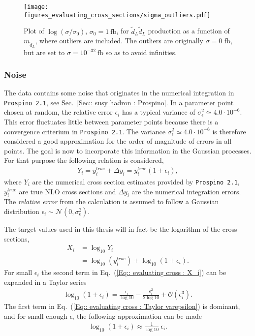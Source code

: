 \documentclass[twoside,english]{uiofysmaster}
\begin{document}
{{\begin{figure}
\centering
\texttt{[image: figures\_evaluating\_cross\_sections/sigma\_outliers.pdf]}
\caption[Plot of cross sections with outlier points]{Plot of $\log( \sigma / \sigma_0)$, $\sigma_0 = 1~\mathrm{fb}$, for $\widetilde{d}_L \widetilde{d}_L$ production as a function of $m_{\widetilde{d}_L}$, where outliers are included. The outliers are originally $\sigma=0$ fb, but are set to $\sigma =10^{-32}~\mathrm{fb}$ so as to avoid infinities.}
\label{Fig:: evaluating cross : sigma w outliers}
\end{figure}


\subsubsection{Noise}\label{Sec:: evaluating cross : Noise in dataset}

The data contains some noise that originates in the numerical integration in \verb|Prospino 2.1|, see Sec.~\ref{Sec:: susy hadron : Prospino}. In a parameter point chosen at random, the relative error $\epsilon_i$ has a typical variance of $\sigma^2_{\epsilon} \simeq 4.0 \cdot 10^{-6}$. This error fluctuates little between parameter points because there is a convergence criterium in \verb|Prospino 2.1|. The variance $\sigma^2_{\epsilon} \simeq 4.0 \cdot 10^{-6}$ is therefore considered a good approximation for the order of magnitude of errors in all points. The goal is now to incorporate this information in the Gaussian processes. For that purpose the following relation is considered,
\begin{align}\label{Eq:: cross section w/ error}
Y_i = y^{true}_i + \Delta y_i = y_i^{true}(1 + \epsilon_i),
\end{align}
where $Y_i$ are the numerical cross section estimates provided by \verb|Prospino 2.1|, $y_i^{true}$ are true NLO cross sections and $\Delta y_i$ are the numerical integration errors. The \textit{relative error} from the calculation is assumed to follow a Gaussian distribution $\epsilon_i \sim \mathcal{N}(0, \sigma_{\epsilon}^2)$. 

The target values used in this thesis will in fact be the logarithm of the cross sections, 
\begin{align}
X_i &= \log_{10} Y_i \nonumber \\
&= \log_{10}(y_i^{true})  + \log_{10}(1 + \epsilon_i).\label{Eq:: evaluating cross : X_i}
\end{align}
For small $\epsilon_i$ the second term in Eq.~(\ref{Eq:: evaluating cross : X_i}) can be expanded in a Taylor series
\begin{align}\label{Eq:: evaluating cross : Taylor varepsilon}
\log_{10}(1 + \epsilon_i) = \frac{\epsilon_i}{\log 10} - \frac{\epsilon_i^2}{2 \log 10} + \mathcal{O}(\epsilon_i^3). 
\end{align} 
The first term in Eq.~(\ref{Eq:: evaluating cross : Taylor varepsilon}) is dominant, and for small enough $\epsilon_i$ the following approximation can be made
\begin{align}
\log_{10}(1 + \epsilon_i) \approx \frac{1}{\log 10} ~\epsilon_i.
\end{align}

}}
\end{document}
